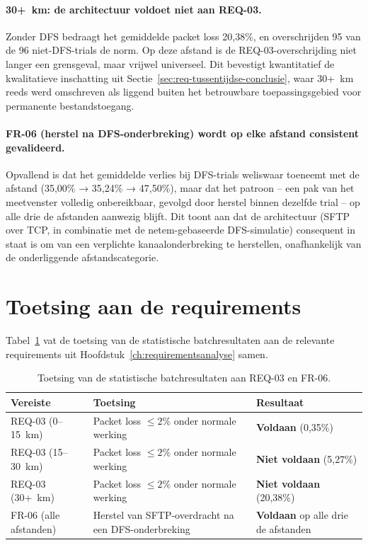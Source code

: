 \paragraph{30+~km: de architectuur voldoet niet aan REQ-03.} Zonder DFS bedraagt het
gemiddelde packet loss 20{,}38\%, en overschrijden 95 van de 96 niet-DFS-trials de norm.
Op deze afstand is de REQ-03-overschrijding niet langer een grensgeval, maar
vrijwel universeel. Dit bevestigt kwantitatief de kwalitatieve inschatting uit
Sectie~\ref{sec:req-tussentijdse-conclusie}, waar 30+~km reeds werd omschreven als
liggend buiten het betrouwbare toepassingsgebied voor permanente bestandstoegang.

\paragraph{FR-06 (herstel na DFS-onderbreking) wordt op elke afstand consistent
gevalideerd.} Opvallend is dat het gemiddelde verlies bij DFS-trials weliswaar toeneemt
met de afstand (35{,}00\% → 35{,}24\% → 47{,}50\%), maar dat het patroon -- een pak van
het meetvenster volledig onbereikbaar, gevolgd door herstel binnen dezelfde trial --
op alle drie de afstanden aanwezig blijft. Dit toont aan dat de architectuur
(SFTP over TCP, in combinatie met de netem-gebaseerde DFS-simulatie) consequent in staat
is om van een verplichte kanaalonderbreking te herstellen, onafhankelijk van de
onderliggende afstandscategorie.

\section{Toetsing aan de requirements}%
\label{sec:res-toetsing}

Tabel~\ref{tab:res-toetsing} vat de toetsing van de statistische batchresultaten aan de
relevante requirements uit Hoofdstuk~\ref{ch:requirementsanalyse} samen.

\begin{table}[h]
  \centering
  \small
  \begin{tabular}{p{1.6cm}p{9.0cm}p{2.4cm}}
    \toprule
    \textbf{Vereiste} & \textbf{Toetsing} & \textbf{Resultaat} \\
    \midrule
    REQ-03 (0--15~km) & Packet loss $\le 2\%$ onder normale werking & \textbf{Voldaan} (0{,}35\%) \\
    REQ-03 (15--30~km) & Packet loss $\le 2\%$ onder normale werking & \textbf{Niet voldaan} (5{,}27\%) \\
    REQ-03 (30+~km) & Packet loss $\le 2\%$ onder normale werking & \textbf{Niet voldaan} (20{,}38\%) \\
    FR-06 (alle afstanden) & Herstel van SFTP-overdracht na een DFS-onderbreking & \textbf{Voldaan} op alle drie de afstanden \\
    \bottomrule
  \end{tabular}
  \caption{Toetsing van de statistische batchresultaten aan REQ-03 en FR-06.}
  \label{tab:res-toetsing}
\end{table}

